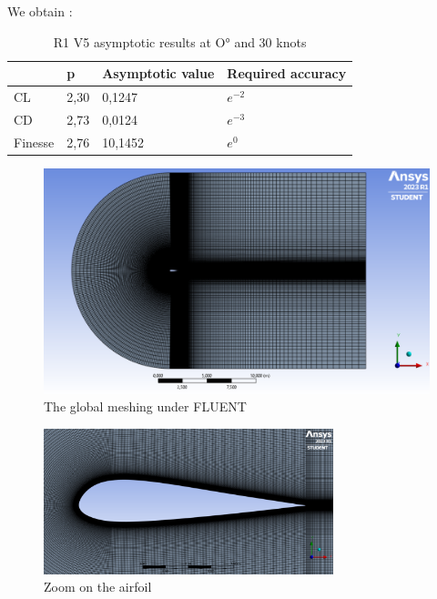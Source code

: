 We obtain : 

\begin{table}[H]
    \center
    \begin{tabular}{|l|l|l|l|}
        \hline
           & p & Asymptotic value & Required accuracy \tabularnewline
        \hline
        CL & 2,30 &  0,1247 & $e^{-2}$ \tabularnewline
        \hline
        CD & 2,73 & 0,0124 & $e^{-3}$ \tabularnewline
        \hline
        Finesse & 2,76 & 10,1452 &  $e^{0}$ \tabularnewline
        \hline
    \end{tabular}
    \caption{R1 V5 asymptotic results at O° and 30 knots}
    \label{tab:R1_V5_asymptotic_results_at_O°_and_35_knots}
\end{table}

\begin{figure}[H]
    \centering
    \includegraphics[width=1\textwidth]{figures/2D steady simulations/fluent/R1 V5 meshing.png}
    \caption{The global meshing under FLUENT}
    \label{fig:The global meshing}
\end{figure}

\begin{figure}[H]
    \centering
    \includegraphics[width=0.75\textwidth]{figures/2D steady simulations/fluent/R1 V5 meshing zoom.png}
    \caption{Zoom on the airfoil}
    \label{fig:Zoom on the meshing}
\end{figure}


